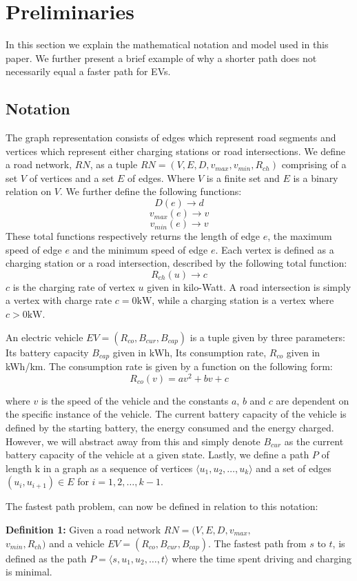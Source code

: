 \section{Preliminaries} \label{sec:notation}
In this section we explain the mathematical notation and model used in this paper. We further present a brief example of why a shorter path does not necessarily equal a faster path for EVs. 

\subsection{Notation}
The graph representation consists of edges which represent road segments and vertices which represent either charging stations or road intersections. We define a road network, $RN$, as a tuple $RN=(V,E,D,v_{max},v_{min},R_{ch})$ comprising of a set $V$ of vertices and a set $E$ of edges. Where $V$ is a finite set and $E$ is a binary relation on $V$. We further define the following functions:
\[ D(e)\rightarrow d \] 
\[ v_{max}(e)\rightarrow v \]
\[ v_{min}(e)\rightarrow v \]
These total functions respectively returns the length of edge $e$, the maximum speed of edge $e$ and the minimum speed of edge $e$. Each vertex is defined as a charging station or a road intersection, described by the following total function:
\[R_{ch}(u)\rightarrow c\]
$c$ is the charging rate of vertex $u$ given in kilo-Watt. A road intersection is simply a vertex with charge rate $c = 0\si{\kW}$, while a charging station is a vertex where $c > 0\si{\kW}$. 

An electric vehicle $EV=(R_{co},B_{cur},B_{cap})$ is a tuple given by three parameters: Its battery capacity $B_{cap}$ given in $\si{\kWh}$, Its consumption rate, $R_{co}$ given in kWh/km. The consumption rate is given by a function on the following form:
\[ R_{co}(v)=av^2+bv+c \]

where $v$ is the speed of the vehicle and the constants $a$, $b$ and $c$ are dependent on the specific instance of the vehicle.  The current battery capacity of the vehicle is defined by the starting battery, the energy consumed and the energy charged. However, we will abstract away from this and simply denote $B_{cur}$ as the current battery capacity of the vehicle at a given state. Lastly, we define a path $P$ of length k in a graph as a sequence of vertices $\langle u_1,u_2,\dots,u_k \rangle$ and a set of edges $(u_{i},u_{i+1})\in E$ for $i=1,2,\dots,k-1$.

The fastest path problem, can now be defined in relation to this notation:

\textbf{Definition 1:} Given a road network $RN=(V,E,D,v_{max},$\\ 
$v_{min},R_{ch})$ and a vehicle $EV=(R_{co},B_{cur},B_{cap})$. The fastest path 
from $s$ to $t$, is defined as the path $P = \langle s,u_1,u_2,\dots,t \rangle$ where the time spent driving and charging is minimal.



